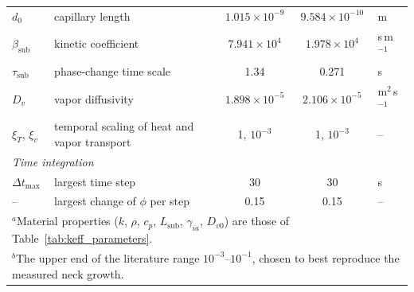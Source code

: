 \begin{table}
\begin{tabular}{l l c c l}
 $d_0$ & capillary length & $1.015 \times 10^{-9}$ & $9.584 \times 10^{-10}$ & m \\
 $\beta_{\mathrm{sub}}$ & kinetic coefficient & $7.941 \times 10^{4}$ & $1.978 \times 10^{4}$ & s\,m$^{-1}$ \\
 $\tau_{\mathrm{sub}}$ & phase-change time scale & 1.34 & 0.271 & s \\
 $D_v$ & vapor diffusivity & $1.898 \times 10^{-5}$ & $2.106 \times 10^{-5}$ & m$^{2}$\,s$^{-1}$ \\
 $\xi_T$, $\xi_v$ & temporal scaling of heat and vapor transport & 1, $10^{-3}$ & 1, $10^{-3}$ & -- \\
 \multicolumn{5}{l}{\textit{Time integration}} \\
 $\Delta t_{\max}$ & largest time step & 30 & 30 & s \\
 -- & largest change of $\phi$ per step & 0.15 & 0.15 & -- \\
\hline
\multicolumn{5}{l}{$^{a}$Material properties ($k$, $\rho$, $c_p$, $L_{\mathrm{sub}}$, $\gamma_{ia}$, $D_{v0}$) are those of Table~\ref{tab:keff_parameters}.} \\
\multicolumn{5}{l}{$^{b}$The upper end of the literature range $10^{-3}$--$10^{-1}$, chosen to best reproduce the measured neck growth.}
\end{tabular}
\label{tab:grainpair_parameters}
\end{table}
